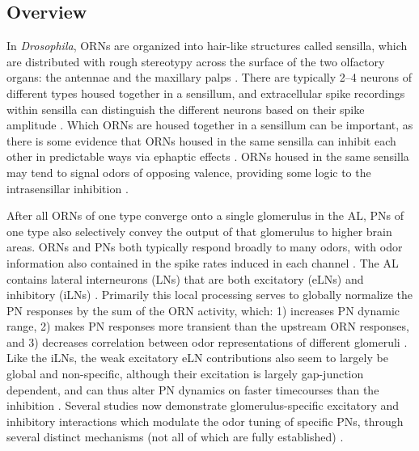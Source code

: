 \documentclass[12pt]{caltech_thesis}
\renewcommand{\cite}{{ }\autocite}
\let\Oldsection\section
\renewcommand{\section}{\FloatBarrier\Oldsection}
\begin{document}
\begin{refsection}
\section{Overview}
In \textit{Drosophila}, ORNs are organized into hair-like structures called sensilla, which are distributed with rough stereotypy across the surface of the two olfactory organs: the antennae and the maxillary palps\cite{SensillaMaps}.
There are typically \numrange{2}{4} neurons of different types housed together in a sensillum, and extracellular spike recordings within sensilla can distinguish the different neurons based on their spike amplitude\cite{Bhandawat2007}.
Which ORNs are housed together in a sensillum can be important, as there is some evidence that ORNs housed in the same sensilla can inhibit each other in predictable ways via ephaptic effects\cite{EphapticSensillaInh}.
ORNs housed in the same sensilla may tend to signal odors of opposing valence, providing some logic to the intrasensillar inhibition\cite{Wu2022}.

After all ORNs of one type converge onto a single glomerulus in the AL, PNs of one type also selectively convey the output of that glomerulus to higher brain areas.
ORNs and PNs both typically respond broadly to many odors, with odor information also contained in the spike rates induced in each channel\cite{Hallem2006,Bhandawat2007}.
The AL contains lateral interneurons (LNs) that are both excitatory (eLNs)\cite{Olsen2007} and inhibitory (iLNs)\cite{Olsen2008}.
Primarily this local processing serves to globally normalize the PN responses by the sum of the ORN activity, which: 1) increases PN dynamic range, 2) makes PN responses more transient than the upstream ORN responses, and 3) decreases correlation between odor representations of different glomeruli\cite{Olsen2008,DivisiveNormalization,Nagel2015}.
Like the iLNs, the weak excitatory eLN contributions also seem to largely be global and non-specific, although their excitation is largely gap-junction dependent, and can thus alter PN dynamics on faster timecourses than the inhibition\cite{Yaksi2010}.
Several studies now demonstrate glomerulus-specific excitatory and inhibitory interactions which modulate the odor tuning of specific PNs, through several distinct mechanisms (not all of which are fully established)\cite{Das2017,Mohamed2019,Zocchi2022}.


\end{refsection}
\end{document}
